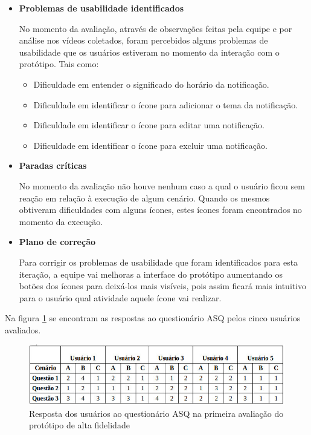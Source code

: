 \begin{itemize}
       \item \textbf{Problemas de usabilidade identificados}
       
       \subitem No momento da avaliação, através de observações feitas pela equipe e por análise nos vídeos coletados, foram percebidos 
       alguns problemas de usabilidade que os usuários estiveram no momento da interação com o protótipo. Tais como:
       
       \begin{itemize}
       
       \item Dificuldade em entender o significado do horário da notificação.
       
       \item Dificuldade em identificar o ícone para adicionar o tema da notificação.
       
       \item Dificuldade em identificar o ícone para editar uma notificação.
       
       \item Dificuldade em identificar o ícone para excluir uma notificação.
       
       \end{itemize}
       
       \item \textbf{Paradas críticas}
       
       \subitem No momento da avaliação não houve nenhum caso a qual o usuário ficou sem reação em relação à execução de algum cenário. 
       Quando os mesmos obtiveram dificuldades com alguns ícones, estes ícones foram encontrados no momento da execução.
       
       \item \textbf{Plano de correção}
       
       \subitem Para corrigir os problemas de usabilidade que foram identificados para esta iteração, a equipe vai melhoras a interface do 
       protótipo aumentando os botões dos ícones para deixá-los mais visíveis, pois assim ficará mais intuitivo para o usuário qual 
       atividade aquele ícone vai realizar.
       
      \end{itemize}
      
      Na figura \ref{asqalta} se encontram as respostas ao questionário ASQ pelos cinco usuários avaliados.
      
      \begin{figure}[!htb]
      \centering
      \includegraphics[scale=0.6]{figuras/asqalta.jpg}
      \caption{Resposta dos usuários ao questionário ASQ na primeira avaliação do protótipo de alta fidelidade}
      \label{asqalta}
      \end{figure}
      
